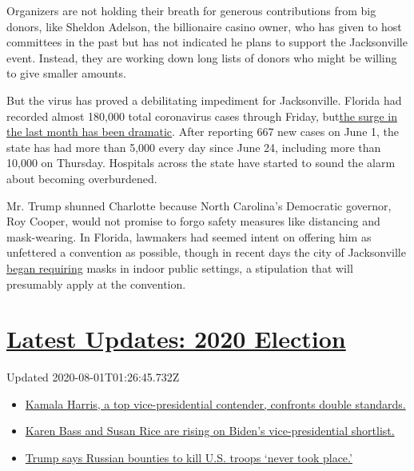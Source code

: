Organizers are not holding their breath for generous contributions from
big donors, like Sheldon Adelson, the billionaire casino owner, who has
given to host committees in the past but has not indicated he plans to
support the Jacksonville event. Instead, they are working down long
lists of donors who might be willing to give smaller amounts.

But the virus has proved a debilitating impediment for Jacksonville.
Florida had recorded almost 180,000 total coronavirus cases through
Friday,
but\href{https://www.nytimes.com/interactive/2020/us/florida-coronavirus-cases.html}{the
surge in the last month has been dramatic}. After reporting 667 new
cases on June 1, the state has had more than 5,000 every day since June
24, including more than 10,000 on Thursday. Hospitals across the state
have started to sound the alarm about becoming overburdened.

Mr. Trump shunned Charlotte because North Carolina's Democratic
governor, Roy Cooper, would not promise to forgo safety measures like
distancing and mask-wearing. In Florida, lawmakers had seemed intent on
offering him as unfettered a convention as possible, though in recent
days the city of Jacksonville
\href{https://www.nytimes.com/2020/06/29/us/politics/rnc-masks-convention.html}{began
requiring} masks in indoor public settings, a stipulation that will
presumably apply at the convention.

\hypertarget{latest-updates-2020-election}{%
\section{\texorpdfstring{\href{https://www.nytimes.com/2020/07/31/us/elections/biden-vs-trump.html?action=click\&pgtype=Article\&state=default\&region=MAIN_CONTENT_1\&context=storylines_live_updates}{Latest
Updates: 2020
Election}}{Latest Updates: 2020 Election}}\label{latest-updates-2020-election}}

Updated 2020-08-01T01:26:45.732Z

\begin{itemize}
\tightlist
\item
  \href{https://www.nytimes.com/2020/07/31/us/elections/biden-vs-trump.html?action=click\&pgtype=Article\&state=default\&region=MAIN_CONTENT_1\&context=storylines_live_updates\#link-29fdff45}{Kamala
  Harris, a top vice-presidential contender, confronts double
  standards.}
\item
  \href{https://www.nytimes.com/2020/07/31/us/elections/biden-vs-trump.html?action=click\&pgtype=Article\&state=default\&region=MAIN_CONTENT_1\&context=storylines_live_updates\#link-13ec3d9c}{Karen
  Bass and Susan Rice are rising on Biden's vice-presidential
  shortlist.}
\item
  \href{https://www.nytimes.com/2020/07/31/us/elections/biden-vs-trump.html?action=click\&pgtype=Article\&state=default\&region=MAIN_CONTENT_1\&context=storylines_live_updates\#link-49e9a016}{Trump
  says Russian bounties to kill U.S. troops `never took place.'}
\end{itemize}

